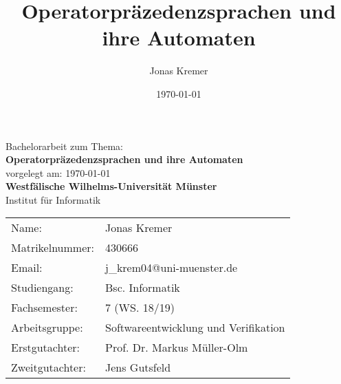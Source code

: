 \documentclass[11pt]{article}
\author{Jonas Kremer}
\title{Operatorpräzedenzsprachen und ihre Automaten}
\date{\today{}}
\theoremstyle{remark}
\theoremstyle{corollary}
\begin{document}
\begin{titlepage}
\thispagestyle{empty}
    \begin{center}
    \large Bachelorarbeit zum Thema:\\
    \vspace{0.5cm}
    \huge \textbf{\textbf{Operatorpräzedenzsprachen und ihre Automaten}} \\
    \vspace{1cm}
    \normalsize
    vorgelegt am: \today \\
    \vspace{2.5cm}
    \large \textbf{Westfälische Wilhelms-Universität Münster}\\
    \vspace{0.5cm} 
    Institut für Informatik
    \vspace{2cm}
    \end{center}
 \normalsize{
    \begin{tabular}{ll}
    	Name: & Jonas Kremer \\
    	Matrikelnummer: & 430666 \\
    	Email: & j\_krem04@uni-muenster.de \\
    	Studiengang: & Bsc. Informatik\\
    	Fachsemester: & 7 (WS. 18/19)\\
    	Arbeitsgruppe: & Softwareentwicklung und Verifikation \\
      	Erstgutachter: & Prof. Dr. Markus Müller-Olm \\
      	Zweitgutachter: & Jens Gutsfeld \\
    \end{tabular}\\
    }
\end{titlepage}

\thispagestyle{empty}
\setcounter{tocdepth}{2}
\tableofcontents
\newpage
\nocite{*}












\thispagestyle{empty}




\end{document}
